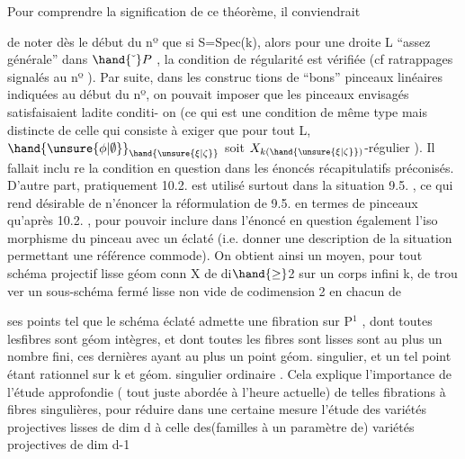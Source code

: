 
Pour comprendre la signification de ce théorème, il conviendrait

de noter dès le début du nº que  si S=Spec(k), alors pour une droite
L ``assez générale'' dans $\hand{\check{\ }}P$ ,  la condition de régularité est vérifiée
(cf ratrappages signalés au  nº ).  Par suite, dans les construc%
tions de ``bons'' pinceaux linéaires  indiquées au début du nº, on pouvait
imposer que les pinceaux envisagés  satisfaisaient ladite conditi-
on  (ce qui  est une condition de même type mais distincte de celle qui consiste à
exiger que pour tout \hand{$\unsure{\xi|\zeta}\in$}L,  $\hand{\unsure{\phi|\emptyset}}_{\hand{\unsure{\xi|\zeta}}}$  soit $X_{k(\hand{\unsure{\xi|\zeta}})}$-régulier ). Il fallait inclu
re la condition en question dans les énoncés récapitulatifs préconisés.
  D'autre part, pratiquement  10.2. est
utilisé surtout dans la situation 9.5. ,  ce qui  rend  désirable de
n'énoncer la réformulation de  9.5.  en termes de pinceaux qu'après
10.2. , pour pouvoir  inclure dans l'énoncé en question  également l'iso
morphisme du pinceau avec un éclaté (i.e. donner une description de la
situation  permettant une référence commode).  On obtient ainsi un
moyen, pour tout schéma projectif lisse géom  conn  X  de di$\hand{\geq}$2 sur un corps infini k,  de trou
ver un sous-schéma fermé lisse non vide de codimension \unsure{|\hand{$\geq$}}2 en chacun de

ses points 
 tel que le schéma éclaté admette une fibration
sur P$^1$ , dont toutes les\hand{/}fibres sont géom intègres, et  dont toutes les fibres sont lisses sont au plus un nombre fini,
ces dernières ayant au plus un point  géom. singulier, et
un tel point  étant rationnel sur k et géom. singulier ordinaire .  Cela
explique l'importance  de l'étude approfondie ( tout juste abordée à l'heure
actuelle) de telles fibrations à fibres singulières, pour réduire dans 
une certaine mesure l'étude des variétés projectives lisses de dim d
à celle des(familles à un paramètre de) variétés projectives de dim d-1\hand{,}

